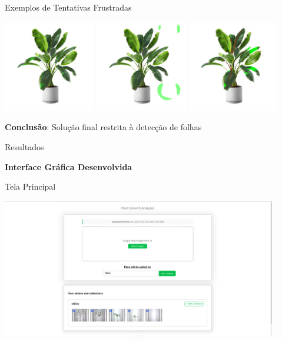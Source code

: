\documentclass[landscape, 12pt]{beamer}
\begin{document}
\begin{frame}{Exemplos de Tentativas Frustradas}
    \begin{center}
        \includegraphics[height=4cm]{../figures/ml_results/attempt1.png}
        \hspace{0.2cm}
        \includegraphics[height=4cm]{../figures/ml_results/attempt2.png}
        \hspace{0.2cm}
        \includegraphics[height=4cm]{../figures/ml_results/attempt3.jpg}
    \end{center}
    
    \vspace{0.3cm}
    \textbf{Conclusão}: Solução final restrita à detecção de folhas
\end{frame}

\begin{frame}{Resultados}
    \begin{center}
        \textbf{Interface Gráfica Desenvolvida}
    \end{center}
\end{frame}

\begin{frame}{Tela Principal}
    \begin{center}
        \includegraphics[width=0.9\textwidth]{../figures/screens/interface-grafica.png}
    \end{center}
\end{frame}
\end{document}
